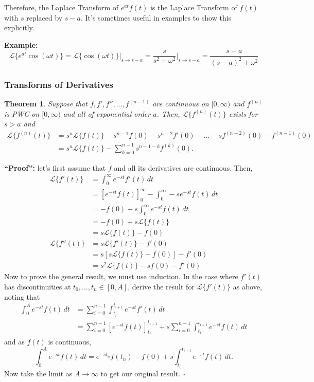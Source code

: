 \documentclass[11pt]{article}
\newtheorem{thm}{Theorem}[section]
\newcommand{\example}{\textbf{Example: }}
\newcommand{\lap}{\mathcal{L}}
\newcommand{\intzi}{\int_0^{\infty}}
\newcommand{\lapft}{\lap\{f(t)\}}
\begin{document}
	Therefore, the Laplace Transform of $e^{at} f(t)$ is the Laplace Transform of $f(t)$ with $s$ replaced by $s-a$. It's sometimes useful in examples to show this explicitly.

	\example
		$$ \lap\{e^{at} \cos(\omega t)\} = \lap\{\cos(\omega t)\} \Big|_{s \to s-a} = \frac{s}{s^2 + \omega^2} \Big|_{s \to s-a} = \frac{s-a}{(s-a)^2 + \omega^2} $$

\subsubsection{Transforms of Derivatives}
	\begin{thm}
		Suppose that $f, f', f'', \ldots, f^{(n-1)}$ are continuous on $[0,\infty)$ and $f^{(n)}$ is PWC on $[0,\infty)$ and all of exponential order $a$. Then, $\lap\{f^{(n)} (t)\}$ exists for $s > a$ and
			\begin{align*}
				\lap\{f^{(n)} (t)\} &= s^n \lapft - s^{n-1} f(0) - s^{n-2} f'(0) - \ldots - s f^{(n-2)} (0) - f^{(n-1)} (0) \\
					&= s^n \lapft - \sum_{k=0}^{n-1} s^{n-1-k} f^{(k)} (0).
			\end{align*}
	\end{thm}

	\textbf{``Proof'':} let's first assume that $f$ and all its derivatives are continuous. Then,
		\begin{align*}
			\lap\{f'(t)\} &= \intzi e^{-st} f'(t)\,dt \\
				&= \left[e^{-st} f(t)\right]_0^{\infty} - \intzi -s e^{-st} f(t) \,dt \\
				&= -f(0) + s \intzi e^{-st} f(t) \,dt \\
				&= -f(0) + s \lapft \\
				&= s \lapft - f(0) \\
			\lap\{f''(t)\} &= s \lap\{f'(t)\} - f'(0) \\
				&= s \left[s \lapft - f(0)\right] - f'(0) \\
				&= s^2 \lapft - sf(0) - f'(0)
		\end{align*}
	Now to prove the general result, we must use induction. In the case where $f'(t)$ has discontinuities at $t_0, \ldots, t_n \in [0,A]$, derive the result for $\lap\{f'(t)\}$ as above, noting that
		\begin{align*}
			\int_0^A e^{-st} f(t) \,dt &= \sum_{i=0}^{n-1} \int_{t_i}^{t_{i+1}} e^{-st} f'(t) \,dt \\
				&= \sum_{i=0}^{n-1} \left[e^{-st} f(t)\right]_{t_i}^{t_{i+1}} + s \sum_{i=0}^{n-1} \int_{t_i}^{t_{i+1}} e^{-st} f(t) \, dt
		\end{align*}
	and as $f(t)$ is continuous,
		$$ \int_0^A e^{-st} f(t) \,dt = e^{-s t_n} f(t_n) - f(0) + s \int_{t_i}^{t_{i+1}} e^{-st} f(t) \, dt .$$
	Now take the limit as $A \to \infty$ to get our original result. $\square$
\end{document}
